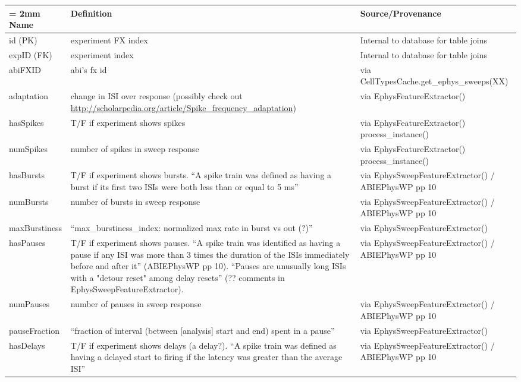 \documentclass[landscape]{article}
\begin{document}
\vspace{2mm}
\begin{tabu}{X[1,r,p]|X[5,l,p]|X[4,l,p]}
\extrarowsep = 2mm
Name & Definition & Source/Provenance \\
\hline
id (PK)			&  experiment FX index 										& Internal to database for table joins  \\
expID (FK)		&  experiment index 										& Internal to database for table joins  \\
abiFXID			&  abi's fx id 												& via CellTypesCache.get\_ephys\_sweeps(XX) \\
adaptation		&  change in ISI over response (possibly check out \url{http://scholarpedia.org/article/Spike_frequency_adaptation})								
																			& via EphysFeatureExtractor() \\
\hline
hasSpikes		&  T/F if experiment shows spikes 							& via EphysFeatureExtractor() process\_instance() \\
numSpikes		&  number of spikes in sweep response 						& via EphysFeatureExtractor() process\_instance() \\
hasBursts		&  T/F if experiment shows bursts. ``A spike train was defined as having a burst if its first two ISIs were both less than or equal to 5 ms'' 							& via EphysSweepFeatureExtractor() / ABIEPhysWP pp 10 \\
numBursts		&  number of bursts in sweep response 						& via EphysSweepFeatureExtractor() / ABIEPhysWP pp 10 \\
\hline
maxBurstiness	& ``max\_burstiness\_index: normalized max rate in burst vs out (?)'' & via EphysSweepFeatureExtractor()  \\
hasPauses		&  T/F if experiment shows pauses. ``A spike train was identified as having a pause if any ISI was more than 3 times the duration of the ISIs immediately before and after it'' (ABIEPhysWP pp 10).  ``Pauses are unusually long ISIs with a "detour reset" among delay resets'' (?? comments in EphysSweepFeatureExtractor). 
																			&  via EphysSweepFeatureExtractor()  / ABIEPhysWP pp 10 \\
numPauses		&  number of pauses in sweep response 						&  via EphysSweepFeatureExtractor()  / ABIEPhysWP pp 10 \\
pauseFraction	&  ``fraction of interval (between [analysis] start and end) spent in a pause''
																			&  via EphysSweepFeatureExtractor() \\
\hline
hasDelays		&  T/F if experiment shows delays (a delay?). ``A spike train was defined as having a delayed start to firing if the latency was greater than the average ISI'' 																				& via EphysSweepFeatureExtractor()  / ABIEPhysWP pp 10  \\

\end{tabu}
\end{document}
